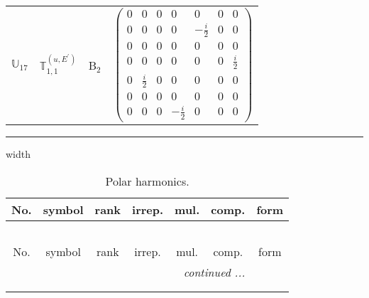 \documentclass[fleqn,10pt,landscape]{article}
\begin{document}
\begin{itemize}
\begin{center}
\begin{longtable}{c|c|c|c}
$ \mathbb{U}_{17} $ & $\mathbb{T}_{1,1}^{(u,E^{\prime})}$ & B$_{2}$ & $\begin{pmatrix} 0 & 0 & 0 & 0 & 0 & 0 & 0 \\ 0 & 0 & 0 & 0 & - \frac{i}{2} & 0 & 0 \\ 0 & 0 & 0 & 0 & 0 & 0 & 0 \\ 0 & 0 & 0 & 0 & 0 & 0 & \frac{i}{2} \\ 0 & \frac{i}{2} & 0 & 0 & 0 & 0 & 0 \\ 0 & 0 & 0 & 0 & 0 & 0 & 0 \\ 0 & 0 & 0 & - \frac{i}{2} & 0 & 0 & 0 \end{pmatrix}$ \\
\end{longtable}
\end{center}

 \hfil \hrule height 1mm width \textwidth \hfil

\begin{center}
\renewcommand{\arraystretch}{1.3}
\begin{longtable}{ccccccc}
\caption{Polar harmonics.}
 \\
 \hline \hline
No. & symbol & rank & irrep. & mul. & comp. & form \\ \hline \endfirsthead

\multicolumn{6}{l}{\tablename\ \thetable{}} \\
 \hline \hline
No. & symbol & rank & irrep. & mul. & comp. & form \\ \hline \endhead

 \hline \hline
\multicolumn{6}{r}{\footnotesize\it continued ...} \\ \endfoot

 \hline \hline
\multicolumn{6}{r}{} \\ \endlastfoot


\end{longtable}
\end{center}
\end{itemize}
\end{document}
